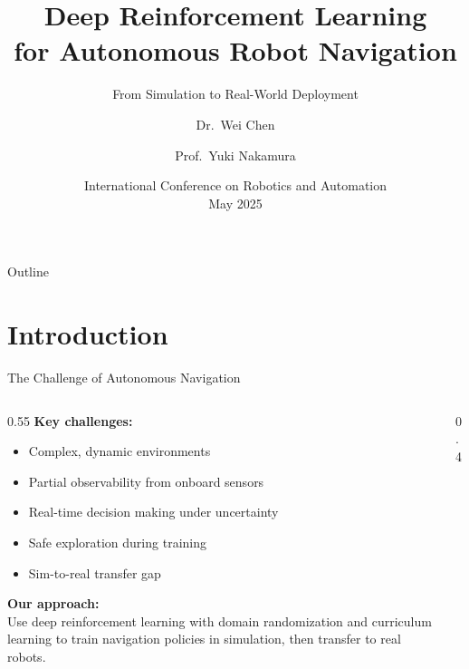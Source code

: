 \documentclass[aspectratio=169]{beamer}
\title[Deep RL for Robotics]{Deep Reinforcement Learning\\for Autonomous Robot Navigation}
\subtitle{From Simulation to Real-World Deployment}
\author[Chen \& Nakamura]{Dr.\ Wei Chen\inst{1} \and Prof.\ Yuki Nakamura\inst{2}}
\institute[MIT \& UTokyo]{\inst{1}MIT CSAIL \and \inst{2}University of Tokyo}
\date[ICRA 2025]{International Conference on Robotics and Automation\\May 2025}
\begin{document}
\begin{frame}
  \titlepage
\end{frame}

\begin{frame}{Outline}
  \tableofcontents
\end{frame}

\section{Introduction}

\begin{frame}{The Challenge of Autonomous Navigation}
  \begin{columns}[T]
    \begin{column}{0.55\textwidth}
      \textbf{Key challenges:}
      \begin{itemize}
        \item Complex, dynamic environments
        \item Partial observability from onboard sensors
        \item Real-time decision making under uncertainty
        \item Safe exploration during training
        \item Sim-to-real transfer gap
      \end{itemize}

      \vspace{0.5cm}
      \textbf{Our approach:}\\
      Use deep reinforcement learning with domain randomization and curriculum learning to train navigation policies in simulation, then transfer to real robots.
    \end{column}
    \begin{column}{0.4\textwidth}
    \end{column}
  \end{columns}
\end{frame}
\end{document}
